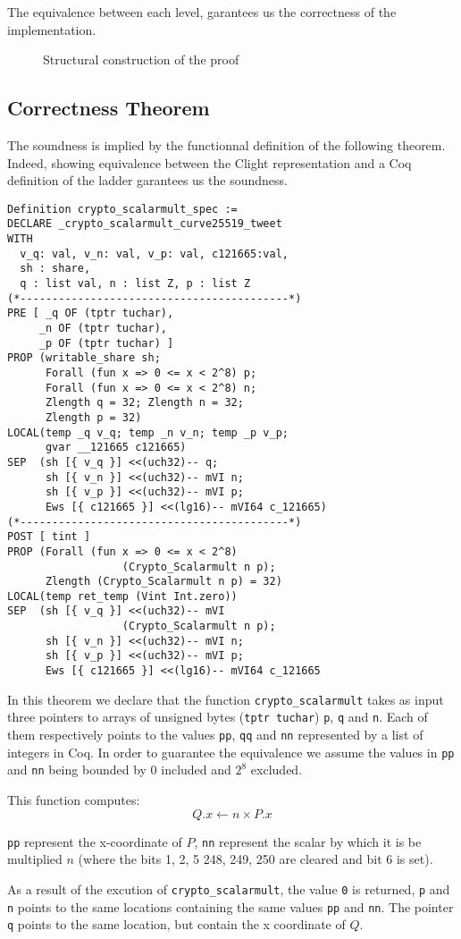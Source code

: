 The equivalence between each level, garantees us the correctness of the
implementation.

\begin{figure}[h]
  
  \caption{Structural construction of the proof}
  \label{tk:ProofStructure}
\end{figure}

\subsection{Correctness Theorem}

The soundness is implied by the functionnal definition of the following theorem.
Indeed, showing equivalence between the Clight representation and a Coq
definition of the ladder garantees us the soundness.

\begin{lstlisting}[language=CoqVST]
Definition crypto_scalarmult_spec :=
DECLARE _crypto_scalarmult_curve25519_tweet
WITH
  v_q: val, v_n: val, v_p: val, c121665:val,
  sh : share,
  q : list val, n : list Z, p : list Z
(*------------------------------------------*)
PRE [ _q OF (tptr tuchar),
     _n OF (tptr tuchar),
     _p OF (tptr tuchar) ]
PROP (writable_share sh;
      Forall (fun x => 0 <= x < 2^8) p;
      Forall (fun x => 0 <= x < 2^8) n;
      Zlength q = 32; Zlength n = 32;
      Zlength p = 32)
LOCAL(temp _q v_q; temp _n v_n; temp _p v_p;
      gvar __121665 c121665)
SEP  (sh [{ v_q }] <<(uch32)-- q;
      sh [{ v_n }] <<(uch32)-- mVI n;
      sh [{ v_p }] <<(uch32)-- mVI p;
      Ews [{ c121665 }] <<(lg16)-- mVI64 c_121665)
(*------------------------------------------*)
POST [ tint ]
PROP (Forall (fun x => 0 <= x < 2^8)
                  (Crypto_Scalarmult n p);
      Zlength (Crypto_Scalarmult n p) = 32)
LOCAL(temp ret_temp (Vint Int.zero))
SEP  (sh [{ v_q }] <<(uch32)-- mVI
                  (Crypto_Scalarmult n p);
      sh [{ v_n }] <<(uch32)-- mVI n;
      sh [{ v_p }] <<(uch32)-- mVI p;
      Ews [{ c121665 }] <<(lg16)-- mVI64 c_121665
\end{lstlisting}

In this theorem we declare that the function \texttt{crypto\_scalarmult} takes as
input three pointers to arrays of unsigned bytes (\texttt{tptr tuchar}) \texttt{p},
\texttt{q} and \texttt{n}.
Each of them respectively points to the values \texttt{pp},  \texttt{qq} and  \texttt{nn}
represented by a list of integers in Coq. In order to guarantee the equivalence
we assume the values in \texttt{pp} and \texttt{nn} being bounded by $0$ included
and $2^8$ excluded.

This function computes: $$Q.x \leftarrow n \times P.x$$

\texttt{pp} represent the x-coordinate of $P$, \texttt{nn} represent the
scalar by which it is be multiplied $n$ (where the bits 1, 2, 5 248, 249, 250
are cleared and bit 6 is set).

As a result of the excution of \texttt{crypto\_scalarmult}, the value \texttt{0}
is returned, \texttt{p} and \texttt{n} points to the same locations containing
the same values \texttt{pp} and \texttt{nn}.
The pointer \texttt{q} points to the same location, but contain the x coordinate of $Q$.
